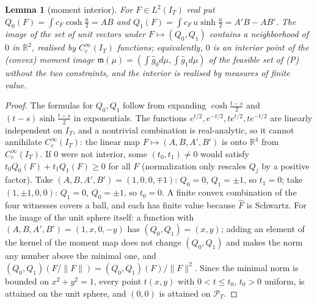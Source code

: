 \documentclass[10pt]{amsart}
\newtheorem{lemma}[theorem]{Lemma}
\theoremstyle{definition}
\theoremstyle{remark}
\newcommand{\R}{\mathbb R}
\newcommand{\PT}{\mathcal P_T}
\newcommand{\IT}{I_T}
\newcommand{\gh}[1]{\widehat g_{#1}}
\newcommand{\Fh}{\widehat F}
\newcommand{\cF}{c_F}
\begin{document}
\begin{lemma}[moment interior]\label{lem:W}
For $F\in L^2(\IT)$ real put $Q_0(F)=\int\cF\cosh\frac u2=A B$ and
$Q_1(F)=\int\cF\,u\sinh\frac u2=A'B-AB'$. The image of the set of unit vectors under
$F\mapsto(Q_0,Q_1)$ contains a neighborhood of $0$ in $\R^2$, realised by $C_c^\infty(\IT)$
functions; equivalently, $0$ is an interior point of the (convex) moment image
$\mathfrak m(\mu)=(\int\gh0d\mu,\int\gh1d\mu)$ of the feasible set of (P) without the two
constraints, and the interior is realised by measures of finite value.
\end{lemma}
\begin{proof}
The formulas for $Q_0,Q_1$ follow from expanding $\cosh\frac{t-s}2$ and $(t-s)\sinh\frac{t-s}2$
in exponentials. The functions $e^{t/2},e^{-t/2},te^{t/2},te^{-t/2}$ are linearly independent
on $\IT$, and a nontrivial combination is real-analytic, so it cannot annihilate
$C_c^\infty(\IT)$: the linear map $F\mapsto(A,B,A',B')$ is onto $\R^4$ from $C_c^\infty(\IT)$.
If $0$ were not interior, some $(t_0,t_1)\ne0$ would satisfy $t_0Q_0(F)+t_1Q_1(F)\ge0$ for all
$F$ (normalization only rescales $Q_j$ by a positive factor). Take $(A,B,A',B')=(1,0,0,\mp1)$:
$Q_0=0$, $Q_1=\pm1$, so $t_1=0$; take $(1,\pm1,0,0)$: $Q_1=0$, $Q_0=\pm1$, so $t_0=0$. A finite
convex combination of the four witnesses covers a ball, and each has finite value because
$\Fh$ is Schwartz. For the image of the unit sphere itself: a function with
$(A,B,A',B')=(1,x,0,-y)$ has $(Q_0,Q_1)=(x,y)$; adding an element of the kernel of the moment map
does not change $(Q_0,Q_1)$ and makes the norm any number above the minimal one, and
$(Q_0,Q_1)(F/\|F\|)=(Q_0,Q_1)(F)/\|F\|^2$. Since the minimal norm is bounded on $x^2+y^2=1$, every
point $t(x,y)$ with $0<t\le t_0$, $t_0>0$ uniform, is attained on the unit sphere, and $(0,0)$ is
attained on $\PT$.
\end{proof}
\end{document}
